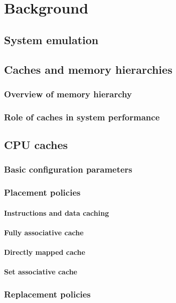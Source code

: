 
\chapter{Background}


\section{System emulation}
%

\section{Caches and memory hierarchies}
\subsection{Overview of memory hierarchy}
\subsection{Role of caches in system performance}
%

\section{CPU caches}
\subsection{Basic configuration parameters}
%
\subsection{Placement policies}
\subsubsection{Instructions and data caching}
\subsubsection{Fully associative cache}
\subsubsection{Directly mapped cache}
\subsubsection{Set associative cache}
%
\subsection{Replacement policies}
